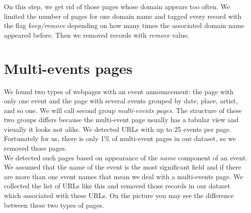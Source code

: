 On this step, we get rid of those pages whose domain appears too often. We limited the number of pages for one domain name and tagged every record with the flag \textit{keep/remove} depending on how many times the associated domain name appeared before. Then we removed records with \textit{remove} value.


\section{Multi-events pages}

We found two types of webpages with an event announcement: the page with only one event and the page with several events grouped by date, place, artist, and so one. We will call second group \textit{multi-events pages}. The structure of these two groups differs because the multi-event page usually has a tabular view and visually it looks not alike. We detected URLs with up to 25 events per page. Fortunately for us, there is only 1\% of multi-event pages in our dataset, so we removed those pages. \\

We detected such pages based on appearance of the \textit{name} component of an event. We assumed that the name of the event is the most significant field and if there are more than one event names that mean we deal with a multi-events page. We collected the list of URLs like this and removed those records in our dataset which associated with these URLs.  On the picture  you may see the difference between these two types of pages.  


